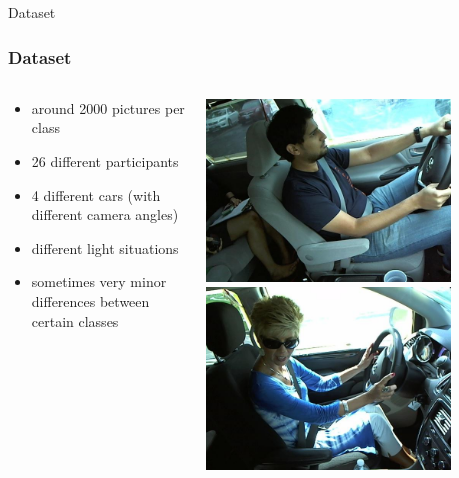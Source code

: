 \documentclass{beamer}
\begin{document}
    \begin{frame}{Dataset}
        \frametitle{Dataset}
        \begin{columns}
        \begin{column}{0.5\textwidth}
            \begin{itemize}
                \item 
                    around 2000 pictures per class
                \item 
                    26 different participants
                \item 
                    4 different cars (with different camera angles)
                \item 
                    different light situations
                \item 
                    sometimes very minor differences between certain classes
             \end{itemize}
        \end{column}
        \begin{column}{0.5\textwidth}
            \begin{center}
                \includegraphics[width=0.8\textwidth]{c0}\\
                \includegraphics[width=0.8\textwidth]{c_0_angle2_passenger}

\end{center}
\end{column}
\end{columns}
\end{frame}
\end{document}
